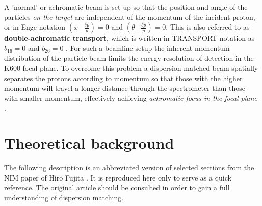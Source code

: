 \documentclass[11pt]{report}
\begin{document}
A 'normal' or achromatic beam is set up so that the position and angle of the particles {\it on the target} 
are independent of the momentum of the incident proton, 
or in Enge \cite{Eng81} notation $(x \mid \frac{\delta p}{p})=0$ and $(\theta \mid \frac{\delta p}{p})=0$. 
This is also referred to as {\bf double-achromatic transport}, which is written
in TRANSPORT notation as $b_{16}=0$ and  $b_{26}=0$  \cite{Fuj02} %
\cite{Wak02}. %
For such a beamline setup the inherent momentum distribution of the particle beam limits the 
energy resolution of detection in the K600 focal plane.
%
To overcome this problem a dispersion matched beam spatially separates the protons according to momentum 
so that those with the higher momentum will travel a longer distance through the spectrometer than those 
with smaller momentum, effectively achieving 
{\it achromatic focus in the focal plane} \cite{Fuj00} \cite{Fuj02}.  %





\section{Theoretical background}

The following description is an abbreviated version of selected sections 
from the NIM paper of Hiro Fujita \cite{Fuj02}. It is reproduced here only to serve
as a quick reference. The original article should be consulted in order
to gain a full understanding of dispersion matching.
\end{document}
